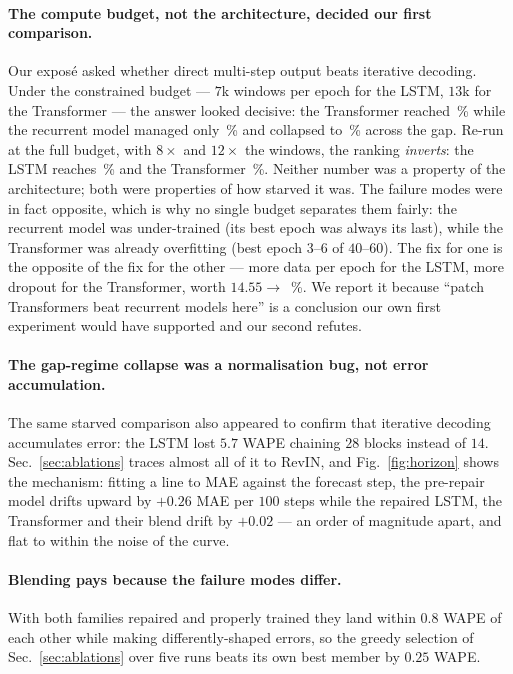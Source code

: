 \documentclass[10pt,twocolumn]{article}
\begin{document}
\paragraph{The compute budget, not the architecture, decided our first comparison.}
Our expos\'e asked whether direct multi-step output beats iterative decoding. Under
the constrained budget --- $7$k windows per epoch for the LSTM, $13$k for the
Transformer --- the answer looked decisive: the Transformer reached
\patchRevinValWape\,\% while the recurrent model managed only \lstmRevinValWape\,\%
and collapsed to \lstmRevinTestWape\,\% across the gap. Re-run at the full budget,
with $8\times$ and $12\times$ the windows, the ranking \emph{inverts}: the LSTM
reaches \lstmValWape\,\% and the Transformer \patchValWape\,\%. Neither number was
a property of the architecture; both were properties of how starved it was. The
failure modes were in fact opposite, which is why no single budget separates them
fairly: the recurrent model was under-trained (its best epoch was always its last),
while the Transformer was already overfitting (best epoch $3$--$6$ of $40$--$60$).
The fix for one is the opposite of the fix for the other --- more data per epoch for
the LSTM, more dropout for the Transformer, worth $14.55 \rightarrow$
\patchValWape\,\%. We report it because ``patch Transformers beat recurrent models
here'' is a conclusion our own first experiment would have supported and our second
refutes.

\paragraph{The gap-regime collapse was a normalisation bug, not error
accumulation.} The same starved comparison also appeared to confirm that iterative
decoding accumulates error: the LSTM lost $5.7$ WAPE chaining $28$ blocks instead
of $14$. Sec.~\ref{sec:ablations} traces almost all of it to RevIN, and
Fig.~\ref{fig:horizon} shows the mechanism: fitting a line to MAE against the
forecast step, the pre-repair model drifts upward by $+0.26$ MAE per $100$ steps
while the repaired LSTM, the Transformer and their blend drift by $+0.02$ --- an
order of magnitude apart, and flat to within the noise of the curve.

\paragraph{Blending pays because the failure modes differ.} With both families
repaired and properly trained they land within $0.8$ WAPE of each other while
making differently-shaped errors, so the greedy selection of Sec.~\ref{sec:ablations}
over five runs beats its own best member by $0.25$ WAPE.
\end{document}

